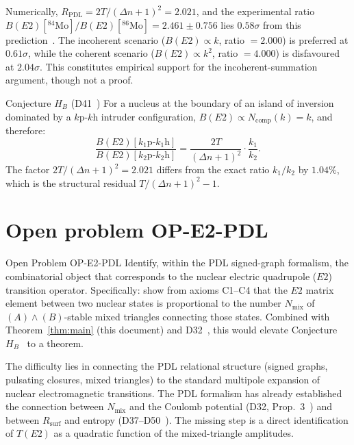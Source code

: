\documentclass[11pt,a4paper]{article}
\theoremstyle{definition}
\theoremstyle{remark}
\newcommand{\Rsurf}{R_{\mathrm{surf}}}
\newcommand{\Tpdl}{T}
\newcommand{\Dn}{\Delta n}
\newcommand{\Ncomp}{N_{\mathrm{comp}}}
\newcommand{\kph}{k\text{p-}k\text{h}}
\begin{document}
Numerically, $R_{\mathrm{PDL}} = 2\Tpdl/(\Dn+1)^2 = 2.021$, and the experimental ratio \\ $B(E2)[^{84}\text{Mo}]/B(E2)[^{86}\text{Mo}] = 2.461 \pm 0.756$ lies $0.58\sigma$ from this prediction~\cite{PDL_D41,Ha_2025}. The incoherent scenario ($B(E2) \propto k$, ratio $= 2.000$) is preferred at $0.61\sigma$, while the coherent scenario ($B(E2) \propto k^2$, ratio $= 4.000$) is disfavoured at $2.04\sigma$. This constitutes empirical support for the incoherent-summation argument, though not a proof.

\begin{pdlconjecture}{Conjecture $H_B$ (D41~\cite{PDL_D41})}
For a nucleus at the boundary of an island of inversion dominated by a $\kph$ intruder configuration, $B(E2) \propto \Ncomp(k) = k$, and therefore:
\begin{equation}
  \frac{B(E2)[k_1\text{p-}k_1\text{h}]}{B(E2)[k_2\text{p-}k_2\text{h}]} = \frac{2\Tpdl}{(\Dn+1)^2} \cdot \frac{k_1}{k_2}.
  \label{eq:HB}
\end{equation}
The factor $2\Tpdl/(\Dn+1)^2 = 2.021$ differs from the exact ratio $k_1/k_2$ by $1.04\%$, which is the structural residual $\Tpdl/(\Dn+1)^2 - 1$.
\end{pdlconjecture}

\section{Open problem OP-E2-PDL}
\label{sec:open}

\begin{pdlopen}{Open Problem OP-E2-PDL}
Identify, within the PDL signed-graph formalism, the combinatorial object that corresponds to the nuclear electric quadrupole ($E2$) transition operator. Specifically: show from axioms C1--C4 that the $E2$ matrix element between two nuclear states is proportional to the number $N_{\mathrm{mix}}$ of $(A)\wedge(B)$-stable mixed triangles connecting those states. Combined with Theorem~\ref{thm:main} (this document) and D32~\cite{PDL_D32}, this would elevate Conjecture $H_B$~\cite{PDL_D41} to a theorem.
\end{pdlopen}

The difficulty lies in connecting the PDL relational structure (signed graphs, pulsating closures, mixed triangles) to the standard multipole expansion of nuclear electromagnetic transitions. The PDL formalism has already established the connection between $N_{\mathrm{mix}}$ and the Coulomb potential (D32, Prop.~3~\cite{PDL_D32}) and between $\Rsurf$ and entropy (D37--D50~\cite{PDL_D37,PDL_D50}). The missing step is a direct identification of $T(E2)$ as a quadratic function of the mixed-triangle amplitudes.
\end{document}
